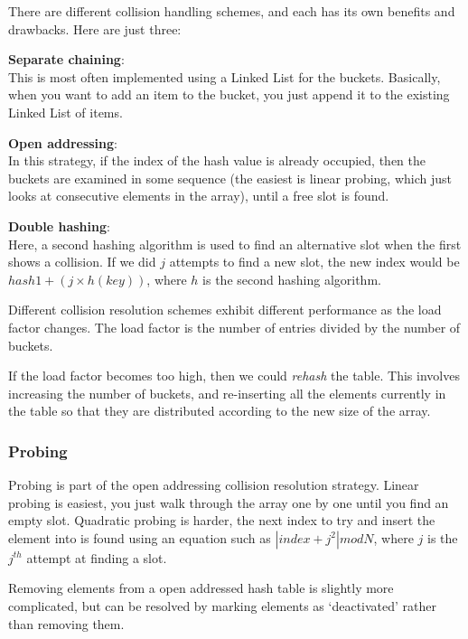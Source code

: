 There are different collision handling schemes, and each has its own benefits
and drawbacks. Here are just three:

\begin{description}
  \item \textbf{Separate chaining}:\\
    This is most often implemented using a Linked List for the buckets.
    Basically, when you want to add an item to the bucket, you just append it to
    the existing Linked List of items.
  \item \textbf{Open addressing}:\\
    In this strategy, if the index of the hash value is already occupied, then
    the buckets are examined in some sequence (the easiest is linear probing,
    which just looks at consecutive elements in the array), until a free slot
    is found.
  \item \textbf{Double hashing}:\\
    Here, a second hashing algorithm is used to find an alternative slot when 
    the first shows a collision. If we did $j$ attempts to find a new slot, the
    new index would be $hash1 + (j \times h(key))$, where $h$ is the second
    hashing algorithm.
\end{description}

Different collision resolution schemes exhibit different performance as the load
factor changes. The load factor is the number of entries divided by the number
of buckets.

If the load factor becomes too high, then we could \textit{rehash} the table.
This involves increasing the number of buckets, and re-inserting all the
elements currently in the table so that they are distributed according to the
new size of the array.

\subsubsection{Probing}

Probing is part of the open addressing collision resolution strategy. Linear
probing is easiest, you just walk through the array one by one until you find an
empty slot. Quadratic probing is harder, the next index to try and insert the
element into is found using an equation such as $|index + j^2| mod N$, where $j$
is the $j^{th}$ attempt at finding a slot.

Removing elements from a open addressed hash table is slightly more complicated,
but can be resolved by marking elements as `deactivated' rather than removing
them.


